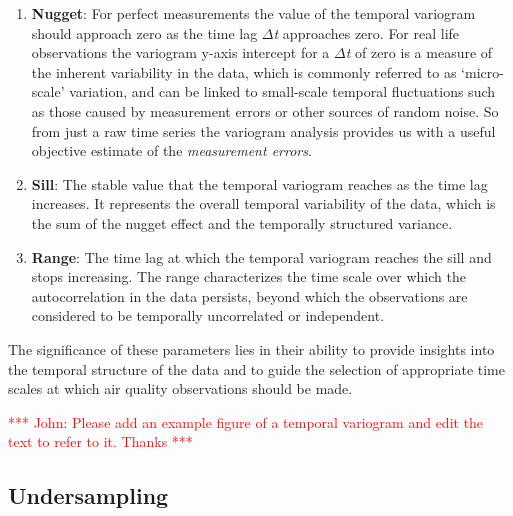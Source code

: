 \documentclass[sensors,article,submit,moreauthors,pdftex]{Definitions/mdpi}
\begin{document}
\begin{enumerate}
    \item \textbf{Nugget}: For perfect measurements the value of the temporal variogram should approach zero as the time lag \textit{$\Delta$t} approaches zero. For real life observations the variogram y-axis intercept for a \textit{$\Delta$t} of zero is a measure of the inherent variability in the data, which is commonly referred to as \lq micro-scale' variation, and can be linked to small-scale temporal fluctuations such as those caused by measurement errors or other sources of random noise. So from just a raw time series the variogram analysis provides us with a useful objective estimate of the \textit{measurement errors}.
    \item \textbf{Sill}: The stable value that the temporal variogram reaches as the time lag increases. It represents the overall temporal variability of the data, which is the sum of the nugget effect and the temporally structured variance.
    \item \textbf{Range}: The time lag at which the temporal variogram reaches the sill and stops increasing. The range characterizes the time scale over which the autocorrelation in the data persists, beyond which the observations are considered to be temporally uncorrelated or independent. 
\end{enumerate}
The significance of these parameters lies in their ability to provide insights into the temporal structure of the data and to guide the selection of appropriate time scales at which air quality observations should be made.

\vspace{0.1in}
\noindent \textcolor{red}{*** John: Please add an example figure of a temporal variogram and edit the text to refer to it. Thanks ***}
\vspace{0.1in}

\subsection{Undersampling}
\end{document}
